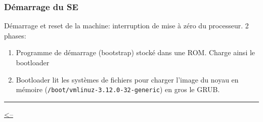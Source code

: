 \subsubsection{Démarrage du SE}\label{duxe9marrage-du-se}

Démarrage et reset de la machine: interruption de mise à zéro du
processeur. 2 phases:

\begin{enumerate}
\def\labelenumi{\arabic{enumi}.}
\tightlist
\item
  Programme de démarrage (bootstrap) stocké dans une ROM. Charge ainsi
  le bootloader
\item
  Bootloader lit les systèmes de fichiers pour charger l'image du noyau
  en mémoire (\texttt{/boot/vmlinuz-3.12.0-32-generic}) en gros le GRUB.
\end{enumerate}

\begin{center}\rule{0.5\linewidth}{0.5pt}\end{center}

\href{../README.md}{\textless--}
